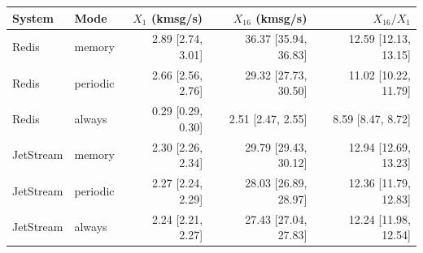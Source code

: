 \begin{tabular}{llrrr}
\toprule
System & Mode & $X_1$ (kmsg/s) & $X_{16}$ (kmsg/s) & $X_{16}/X_1$\\
\midrule
Redis & memory & 2.89 [2.74, 3.01] & 36.37 [35.94, 36.83] & 12.59 [12.13, 13.15]\\
Redis & periodic & 2.66 [2.56, 2.76] & 29.32 [27.73, 30.50] & 11.02 [10.22, 11.79]\\
Redis & always & 0.29 [0.29, 0.30] & 2.51 [2.47, 2.55] & 8.59 [8.47, 8.72]\\
JetStream & memory & 2.30 [2.26, 2.34] & 29.79 [29.43, 30.12] & 12.94 [12.69, 13.23]\\
JetStream & periodic & 2.27 [2.24, 2.29] & 28.03 [26.89, 28.97] & 12.36 [11.79, 12.83]\\
JetStream & always & 2.24 [2.21, 2.27] & 27.43 [27.04, 27.83] & 12.24 [11.98, 12.54]\\
\bottomrule
\end{tabular}
